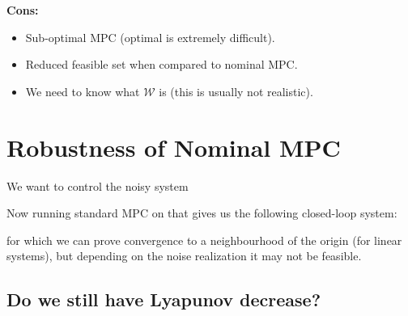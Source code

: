 \documentclass[8pt,a4paper]{scrartcl}
\begin{document}
\begin{multicols*}{3}
\begin{multicols*}{4}
\textbf{Cons:}
\begin{itemize}

\item Sub-optimal MPC (optimal is extremely difficult).
\item Reduced feasible set when compared to nominal MPC.
\item We need to know what $\mathcal{W}$ is (this is usually not realistic).
\end{itemize}


\section{Robustness of Nominal MPC}

We want to control the noisy system


Now running standard MPC on that gives us the following closed-loop system:


for which we can prove convergence to a neighbourhood of the origin (for linear systems), but depending on the noise realization it may not be feasible.

\subsection{Do we still have Lyapunov decrease?}


\end{multicols*}
\end{multicols*}
\end{document}
